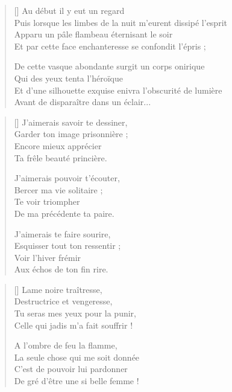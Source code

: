 \settowidth{\versewidth}{Puis lorsque les limbes de la nuit m'eurent dissipé l'esprit}
\begin{verse}[\versewidth]
Au début il y eut un regard \\
Puis lorsque les limbes de la nuit m'eurent dissipé l'esprit \\
Apparu un pâle flambeau éternisant le soir \\
Et par cette face enchanteresse se confondit l'épris ;

De cette vasque abondante surgit un corps onirique \\
Qui des yeux tenta l'héroïque \\
Et d'une silhouette exquise enivra l'obscurité de lumière \\
Avant de disparaître dans un éclair...
\end{verse}


\settowidth{\versewidth}{Esquisser tout ton ressentir ;}
\begin{verse}[\versewidth]
J'aimerais savoir te dessiner, \\
Garder ton image prisonnière ; \\
Encore mieux apprécier \\
Ta frêle beauté princière.

J'aimerais pouvoir t'écouter, \\
Bercer ma vie solitaire ; \\
Te voir triompher \\
De ma précédente ta paire.

J'aimerais te faire sourire, \\
Esquisser tout ton ressentir ; \\
Voir l'hiver frémir \\
Aux échos de ton fin rire.
\end{verse}

\newpage

\settowidth{\versewidth}{Celle qui jadis m'a fait souffrir !}
\begin{verse}[\versewidth]
Lame noire traîtresse, \\
Destructrice et vengeresse, \\
Tu seras mes yeux pour la punir, \\
Celle qui jadis m'a fait souffrir !

A l'ombre de feu la flamme, \\
La seule chose qui me soit donnée \\
C'est de pouvoir lui pardonner \\
De gré d'être une si belle femme !
\end{verse}

